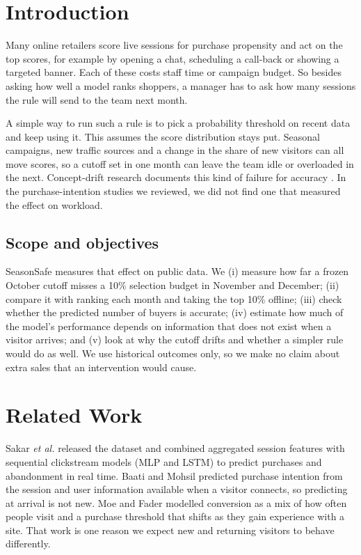\documentclass[conference]{IEEEtran}
\begin{document}
\section{Introduction}
Many online retailers score live sessions for purchase propensity and act on the top scores, for
example by opening a chat, scheduling a call-back or showing a targeted banner. Each of these costs
staff time or campaign budget. So besides asking how well a model ranks shoppers, a manager has to
ask how many sessions the rule will send to the team next month.

A simple way to run such a rule is to pick a probability threshold on recent data and keep using it.
This assumes the score distribution stays put. Seasonal campaigns, new traffic sources and a change in
the share of new visitors can all move scores, so a cutoff set in one month can leave the team idle or
overloaded in the next. Concept-drift research documents this kind of failure for accuracy
\cite{b7,b8}. In the purchase-intention studies we reviewed, we did not find one that measured the
effect on workload.

\subsection{Scope and objectives}
SeasonSafe measures that effect on public data. We (i) measure how far a frozen October cutoff misses
a 10\% selection budget in November and December; (ii) compare it with ranking each month and taking
the top 10\% offline; (iii) check whether the predicted number of buyers is accurate; (iv) estimate how
much of the model's performance depends on information that does not exist when a visitor arrives; and
(v) look at why the cutoff drifts and whether a simpler rule would do as well. We use historical
outcomes only, so we make no claim about extra sales that an intervention would cause.

\section{Related Work}
Sakar \emph{et al.} \cite{b2} released the dataset and combined aggregated session features with
sequential clickstream models (MLP and LSTM) to predict purchases and abandonment in real time. Baati
and Mohsil \cite{b3} predicted purchase intention from the session and user information available when a
visitor connects, so predicting at arrival is not new. Moe and Fader \cite{b9} modelled conversion as a
mix of how often people visit and a purchase threshold that shifts as they gain experience with a site.
That work is one reason we expect new and returning visitors to behave differently.
\end{document}
